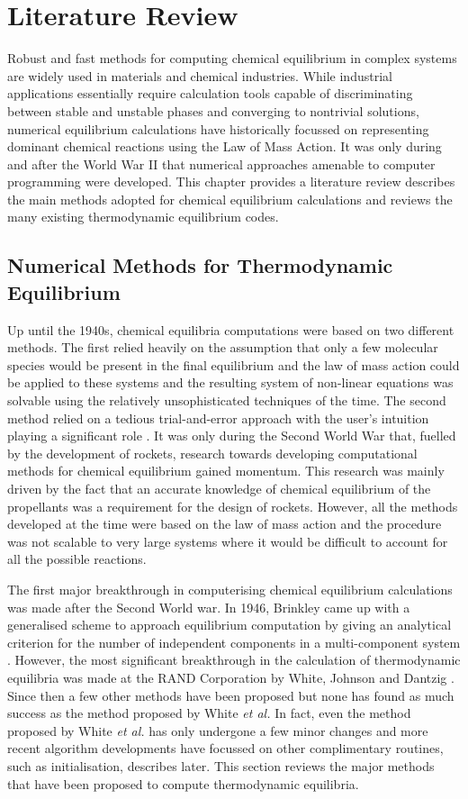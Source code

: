 \chapter{Literature Review} \label{chapter_4}

	Robust and fast methods for computing chemical equilibrium in complex systems are widely used in materials and chemical industries. While industrial applications essentially require calculation tools capable of discriminating between stable and unstable phases and converging to nontrivial solutions, numerical equilibrium calculations have historically focussed on representing dominant chemical reactions using the Law of Mass Action. It was only during and after the World War {II} that numerical approaches amenable to computer programming were developed. This chapter provides a literature review describes the main methods adopted for chemical equilibrium calculations and reviews the many existing thermodynamic equilibrium codes.

\section{Numerical Methods for Thermodynamic Equilibrium}
	Up until the 1940s, chemical equilibria computations were based on two different methods. The first relied heavily on the assumption that only a few molecular species would be present in the final equilibrium and the law of mass action could be applied to these systems and the resulting system of non-linear equations was solvable using the relatively unsophisticated techniques of the time. The second method relied on a tedious trial-and-error approach with the user's intuition playing a significant role \cite{vanZeggeren11}. It was only during the Second World War that, fuelled by the development of rockets, research towards developing computational methods for chemical equilibrium gained momentum. This research was mainly driven by the fact that an accurate knowledge of chemical equilibrium of the propellants was a requirement for the design of rockets. However, all the methods developed at the time were based on the law of mass action and the procedure was not scalable to very large systems where it would be difficult to account for all the possible reactions. 
	
	The first major breakthrough in computerising chemical equilibrium calculations was made after the Second World war. In 1946, Brinkley came up with a generalised scheme to approach equilibrium computation by giving an analytical criterion for the number of independent components in a multi-component system \cite{vanZeggeren11}. However, the most significant breakthrough in the calculation of thermodynamic equilibria was made at the RAND Corporation by White, Johnson and Dantzig  \cite{White:58}. Since then a few other methods have been proposed but none has found as much success as the method proposed by White \textit{et al.} In fact, even the method proposed by White \textit{et al.} has only undergone a few minor changes and more recent algorithm developments have focussed on other complimentary routines, such as initialisation, describes later. This section reviews the major methods that have been proposed to compute thermodynamic equilibria.	
	
